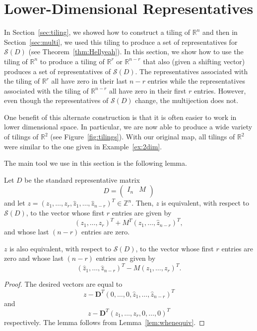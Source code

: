 \documentclass[ALCO,ThmDefs,Unicode,epreuves]{cedram}
\newcommand{\R}{\mathbb{R}}
\newcommand{\Z}{\mathbb{Z}}
\newcommand{\D}{\mathbf{D}}
\newcommand{\Sand}{\mathcal{S}}
\begin{document}
\section{Lower-Dimensional Representatives}\label{sec:Lower}

In Section~\ref{sec:tiling}, we showed how to construct a tiling of $\R^{n}$ and then in Section~\ref{sec:multi}, we used this tiling to produce a set of representatives for $\Sand(D)$ (see Theorem~\ref{thm:Hellyeah}). In this section, we show how to use the tiling of $\R^{n}$ to produce a tiling of $\R^r$ or $\R^{n-r}$ that also (given a shifting vector) produces a set of representatives of $\Sand(D)$. The representatives associated with the tiling of $\R^r$ all have zero in their last $n-r$ entries while the representatives associated with the tiling of $\R^{n-r}$ all have zero in their first $r$ entries. However, even though the representatives of $\Sand(D)$ change, the multijection does not. 

One benefit of this alternate construction is that it is often easier to work in lower dimensional space. In particular, we are now able to produce a wide variety of tilings of $\R^2$ (see Figure~\ref{fig:tilings}). With our original map, all tilings of $\R^2$ were similar to the one given in Example~\ref{ex:2dim}.

The main tool we use in this section is the following lemma. 

\begin{lemma}\label{lem:lowerdim}
Let $D$ be the standard representative matrix
\[
 D = \begin{pmatrix}
I_n &M \\
\end{pmatrix}
\]
and let $z = (z_1,\dots, z_r,\widehat z_1,\dots, \widehat z_{n-r})^T\in \Z^{n}$. Then, $z$ is equivalent, with respect to $\Sand(D)$, to the vector whose first $r$ entries are given by
\[
(z_1,\dots, z_r)^T + M^T(\widehat z_1,\dots,\widehat z_{n-r})^T,
\]
and whose last $(n-r)$ entries are zero. 

$z$ is also equivalent, with respect to $\Sand(D)$, to the vector whose first $r$ entries are zero and whose last $(n-r)$ entries are given by
\[
(\widehat z_1,\dots, \widehat z_{n-r})^T - M(z_1,\dots,z_r)^T.
\]
\end{lemma}

\begin{proof}

The desired vectors are equal to 
\[
z - \D^T(0,\dots, 0,\widehat z_1,\dots,\widehat z_{n-r})^T
\]
and 
\[
z - \D^T(z_1,\dots,z_r,0,\dots, 0)^T
\] 
respectively. The lemma follows from Lemma~\ref{lem:whenequiv}.
\end{proof}
\end{document}
